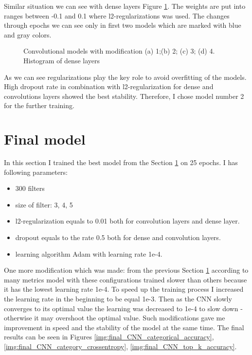 \clearpage
Similar situation we can see with dense layers Figure \ref{img:Convolutional models with modification Histogram of dense layers}. The weights are put into ranges between -0.1 and 0.1 where l2-regularizations was used.
The changes through epochs we can see only in first two models which are marked with blue and gray colors.   

\begin{figure}[ht]
	\begin{minipage}[ht]{1\linewidth}
	\end{minipage}
	\hfill
	\begin{minipage}[ht]{1\linewidth}
	\end{minipage}
	\caption{Convolutional models with modification (a) 1;(b) 2; (c) 3; (d) 4.  Histogram of dense layers}
	\label{img:Convolutional models with modification Histogram of dense layers}  
\end{figure}


As we can see regularizations play the key role to avoid overfitting of the models. High dropout rate in combination with l2-regularization for dense and convolutions layers showed the best stability. Therefore, I chose model number 2 for the further training. 

\clearpage
\section{Final model} \label{sect4_5}

In this section I trained the best model from the Section \ref{sect4_5} on 25 epochs.
I has following parameters:

\begin{itemize}
	\item 300 filters
	\item size of filter: 3, 4, 5
	\item l2-regularization equals to 0.01 both for convolution layers and dense layer. 
	\item dropout equals to the rate 0.5 both for dense and convolution layers. 
	\item learning algorithm Adam with learning rate 1e-4. 
\end{itemize}

One more modification which was made: from the previous Section \ref{sect4_5}
according to many metrics model with these configurations trained slower than others because 
it has the lowest learning rate 1e-4. To speed up the training process I increased the learning rate in the beginning to be equal 1e-3. Then as the CNN slowly converges to its optimal value
the learning was decreased to 1e-4 to slow down - otherwise it may overshoot the optimal value.
Such modifications gave me improvement in speed and the stability of the model at the same time.
The final results can be seen in Figures \ref{img:final_CNN_categorical_accuracy}, 
\ref{img:final_CNN_category_crossentropy}, \ref{img:final_CNN_top_k_accuracy}.


